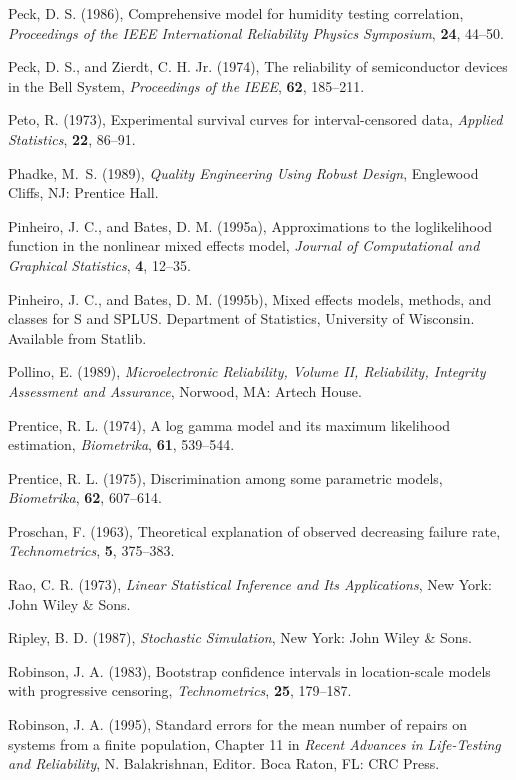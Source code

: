 \begin{thebibliography}{999}
Peck, D. S. (1986), Comprehensive model for humidity testing
correlation, {\em Proceedings of the IEEE International
Reliability Physics Symposium}, {\bf 24}, 44--50.

Peck, D. S., and Zierdt, C. H. Jr.  (1974), The reliability of
semiconductor devices in the Bell System, {\em Proceedings of the
IEEE}, {\bf 62}, 185--211.

Peto, R. (1973), Experimental survival curves for interval-censored
data, {\em Applied Statistics}, {\bf 22}, 86--91.

Phadke, M.~S. (1989), {\em Quality Engineering Using Robust Design},
Englewood Cliffs, NJ: Prentice Hall.

Pinheiro, J. C., and Bates, D. M. (1995a), Approximations to the
loglikelihood function in the nonlinear mixed effects model, 
{\em Journal of Computational and Graphical Statistics},  {\bf 4}, 12--35.

Pinheiro, J. C., and Bates, D. M. (1995b), Mixed effects models,
methods, and classes for S and SPLUS.  Department of Statistics,
University of Wisconsin.  Available from Statlib.

Pollino, E. (1989), {\em Microelectronic Reliability, Volume II,
Reliability, Integrity Assessment and Assurance}, Norwood, MA: Artech
House.

Prentice, R. L. (1974), A log gamma model and its maximum likelihood
estimation, {\em Biometrika}, {\bf 61}, 539--544.

Prentice, R. L. (1975), Discrimination among some parametric models,
{\em Biometrika}, {\bf 62}, 607--614.

Proschan, F. (1963), Theoretical explanation of observed decreasing
failure rate, {\em Technometrics}, {\bf 5}, 375--383.

Rao, C. R. (1973), {\em Linear Statistical Inference and Its
Applications}, New York: John Wiley \& Sons.

Ripley, B. D. (1987), {\em Stochastic Simulation}, New York: John
Wiley \& Sons.

Robinson, J. A. (1983), Bootstrap confidence intervals in
location-scale models with progressive censoring, {\em Technometrics},
{\bf 25}, 179--187.

Robinson, J. A. (1995), Standard errors for the mean number of repairs
on systems from a finite population, Chapter 11 in {\em Recent
Advances in Life-Testing and Reliability}, N. Balakrishnan, Editor.
Boca Raton, FL: CRC Press.


\end{thebibliography}
